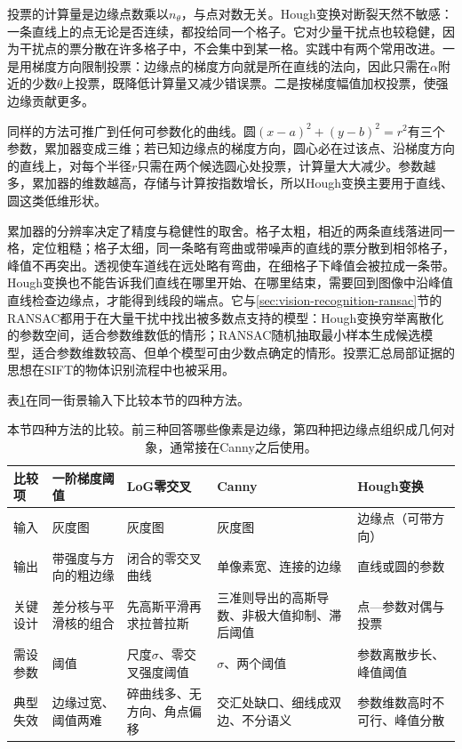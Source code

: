 投票的计算量是边缘点数乘以$n_{\theta}$，与点对数无关。Hough变换对断裂天然不敏感：一条直线上的点无论是否连续，都投给同一个格子。它对少量干扰点也较稳健，因为干扰点的票分散在许多格子中，不会集中到某一格。实践中有两个常用改进。一是用梯度方向限制投票：边缘点的梯度方向就是所在直线的法向，因此只需在$\alpha$附近的少数$\theta$上投票，既降低计算量又减少错误票。二是按梯度幅值加权投票，使强边缘贡献更多。

同样的方法可推广到任何可参数化的曲线。圆$(x-a)^2+(y-b)^2=r^2$有三个参数，累加器变成三维；若已知边缘点的梯度方向，圆心必在过该点、沿梯度方向的直线上，对每个半径$r$只需在两个候选圆心处投票，计算量大大减少。参数越多，累加器的维数越高，存储与计算按指数增长，所以Hough变换主要用于直线、圆这类低维形状。

累加器的分辨率决定了精度与稳健性的取舍。格子太粗，相近的两条直线落进同一格，定位粗糙；格子太细，同一条略有弯曲或带噪声的直线的票分散到相邻格子，峰值不再突出。透视使车道线在远处略有弯曲，在细格子下峰值会被拉成一条带。Hough变换也不能告诉我们直线在哪里开始、在哪里结束，需要回到图像中沿峰值直线检查边缘点，才能得到线段的端点。它与\ref{sec:vision-recognition-ransac}节的RANSAC都用于在大量干扰中找出被多数点支持的模型：Hough变换穷举离散化的参数空间，适合参数维数低的情形；RANSAC随机抽取最小样本生成候选模型，适合参数维数较高、但单个模型可由少数点确定的情形。投票汇总局部证据的思想在SIFT的物体识别流程中也被采用。

表\ref{tab:vision-features-edge-compare}在同一街景输入下比较本节的四种方法。

\begin{table}[tbp]
  \centering
  \small
  \begin{tabularx}{\linewidth}{@{}lXXXX@{}}
    \toprule
    比较项 & 一阶梯度阈值 & LoG零交叉 & Canny & Hough变换 \\
    \midrule
    输入 & 灰度图 & 灰度图 & 灰度图 & 边缘点（可带方向） \\
    输出 & 带强度与方向的粗边缘 & 闭合的零交叉曲线 & 单像素宽、连接的边缘 & 直线或圆的参数 \\
    关键设计 & 差分核与平滑核的组合 & 先高斯平滑再求拉普拉斯 & 三准则导出的高斯导数、非极大值抑制、滞后阈值 & 点—参数对偶与投票 \\
    需设参数 & 阈值 & 尺度$\sigma$、零交叉强度阈值 & $\sigma$、两个阈值 & 参数离散步长、峰值阈值 \\
    典型失效 & 边缘过宽、阈值两难 & 碎曲线多、无方向、角点偏移 & 交汇处缺口、细线成双边、不分语义 & 参数维数高时不可行、峰值分散 \\
    \bottomrule
  \end{tabularx}
  \caption{本节四种方法的比较。前三种回答哪些像素是边缘，第四种把边缘点组织成几何对象，通常接在Canny之后使用。}
  \label{tab:vision-features-edge-compare}
\end{table}

